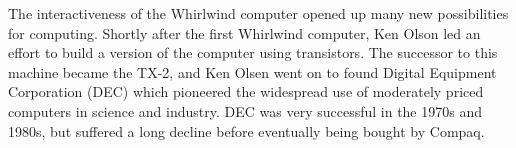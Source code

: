 \begin{schemeregion}
The interactiveness of the Whirlwind computer opened up many new possibilities for computing.  Shortly after the first Whirlwind computer, Ken Olson led an effort to build a version of the computer using transistors.  The successor to this machine became the TX-2, and Ken Olsen went on to found Digital Equipment Corporation (DEC) which pioneered the widespread use of moderately priced computers in science and industry.  DEC was very successful in the 1970s and 1980s, but  suffered a long decline before eventually being bought by Compaq.


\end{schemeregion}
